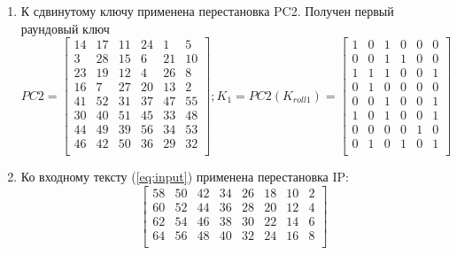 \documentclass[a4paper, 14pt]{extarticle}
\begin{document}
\begin{enumerate}
    \item К сдвинутому ключу применена перестановка PC2. Получен первый раундовый ключ
    \begin{equation}\label{eq:k1}
        PC2 = \begin{bmatrix}
            14  & 17  & 11  & 24  & 1   & 5   \\
            3   & 28  & 15  & 6   & 21  & 10  \\
            23  & 19  & 12  & 4   & 26  & 8   \\
            16  & 7   & 27  & 20  & 13  & 2   \\
            41  & 52  & 31  & 37  & 47  & 55  \\
            30  & 40  & 51  & 45  & 33  & 48  \\
            44  & 49  & 39  & 56  & 34  & 53  \\
            46  & 42  & 50  & 36  & 29  & 32  \\
        \end{bmatrix}; K_1 = PC2(K_{roll1}) = \begin{bmatrix}
            1   & 0   & 1   & 0   & 0   & 0   \\
            0   & 0   & 1   & 1   & 0   & 0   \\
            1   & 1   & 1   & 0   & 0   & 1   \\
            0   & 1   & 0   & 0   & 0   & 0   \\
            0   & 0   & 1   & 0   & 0   & 1   \\
            1   & 0   & 1   & 0   & 0   & 1   \\
            0   & 0   & 0   & 0   & 1   & 0   \\
            0   & 1   & 0   & 1   & 0   & 1   \\
        \end{bmatrix}
    \end{equation}
    \item Ко входному тексту (\ref{eq:input}) применена перестановка IP:\@
    \begin{equation}\label{eq:ip}
        \begin{bmatrix}
            58  & 50  & 42  & 34  & 26  & 18  & 10  & 2   \\
            60  & 52  & 44  & 36  & 28  & 20  & 12  & 4   \\
            62  & 54  & 46  & 38  & 30  & 22  & 14  & 6   \\
            64  & 56  & 48  & 40  & 32  & 24  & 16  & 8   \\

\end{bmatrix}
\end{equation}
\end{enumerate}
\end{document}
